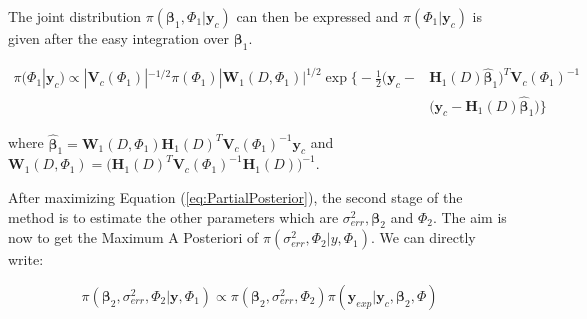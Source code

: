 \documentclass[soumission]{jsfds}
\newcommand{\EqRef}[1] {Equation (\ref{#1})}
\edef\hc{\string: }
\begin{document}


  
\iffalse
{\color{blue}
The joint distribution $\pi(\boldsymbol{\beta}_1,\Phi_1|\boldsymbol{y}_c)$ 
can then be expressed and $\pi(\Phi_1|\boldsymbol{y}_c)$ is given after the easy integration over $\boldsymbol{\beta}_1$.

\begin{equation}
\begin{split}
\pi(\Phi_1|\boldsymbol{y}_c)\propto |\boldsymbol{V}_c(\Phi_1)|^{-1/2}\pi(\Phi_1)|\boldsymbol{W}_1(D,\Phi_1)|^{1/2}\exp\Bigg\{-\frac{1}{2}\Big(\boldsymbol{y}_c-&\boldsymbol{H}_1(D)\hat{\boldsymbol{\beta}}_1\Big)^T\boldsymbol{V}_c(\Phi_1)^{-1}\\
&\Big(\boldsymbol{y}_c-\boldsymbol{H}_1(D)\hat{\boldsymbol{\beta}}_1\Big)\Bigg\}
\end{split}
\label{eq:PartialPosterior}
\end{equation}

where $\hat{\boldsymbol{\beta}}_1=\boldsymbol{W}_1(D,\Phi_1)\boldsymbol{H}_1(D)^T\boldsymbol{V}_c(\Phi_1)^{-1}\boldsymbol{y}_c$ and $\boldsymbol{W}_1(D,\Phi_1)=\Big(\boldsymbol{H}_1(D)^T\boldsymbol{V}_c(\Phi_1)^{-1}\boldsymbol{H}_1(D)\Big)^{-1}$. \newline

After maximizing \EqRef{eq:PartialPosterior}, the second stage of the method is to estimate the other parameters which are $\sigma_{err}^2, \boldsymbol{\beta}_2$ and $\Phi_2$. The aim is now to get the Maximum A Posteriori of $\pi(\sigma_{err}^2,\Phi_2|y,\Phi_1)$. We can directly write\hc

\begin{equation}
\pi(\boldsymbol{\beta}_2,\sigma_{err}^2,\Phi_2|\boldsymbol{y},\Phi_1) \propto \pi(\boldsymbol{\beta}_2,\sigma_{err}^2,\Phi_2)\pi(\boldsymbol{y}_{exp}|\boldsymbol{y}_c,\boldsymbol{\beta}_2,\Phi)
\end{equation}

}
\end{document}
